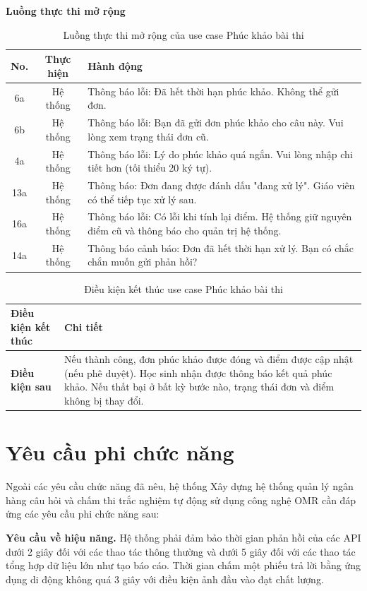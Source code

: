 ﻿\documentclass[../DoAn.tex]{subfiles}
\begin{document}
\noindent\textbf{Luồng thực thi mở rộng}
\begin{table}[H]
\centering
\begin{tabular}{|c|c|p{9cm}|}
\hline
\textbf{No.} & \textbf{Thực hiện} & \textbf{Hành động} \\ \hline
6a & Hệ thống & Thông báo lỗi: Đã hết thời hạn phúc khảo. Không thể gửi đơn. \\ \hline
6b & Hệ thống & Thông báo lỗi: Bạn đã gửi đơn phúc khảo cho câu này. Vui lòng xem trạng thái đơn cũ. \\ \hline
4a & Hệ thống & Thông báo lỗi: Lý do phúc khảo quá ngắn. Vui lòng nhập chi tiết hơn (tối thiểu 20 ký tự). \\ \hline
13a & Hệ thống & Thông báo: Đơn đang được đánh dấu "đang xử lý". Giáo viên có thể tiếp tục xử lý sau. \\ \hline
16a & Hệ thống & Thông báo lỗi: Có lỗi khi tính lại điểm. Hệ thống giữ nguyên điểm cũ và thông báo cho quản trị hệ thống. \\ \hline
14a & Hệ thống & Thông báo cảnh báo: Đơn đã hết thời hạn xử lý. Bạn có chắc chắn muốn gửi phản hồi? \\ \hline
\end{tabular}
\caption{Luồng thực thi mở rộng của use case Phúc khảo bài thi}
\label{table:2.3.5_ext}
\end{table}
\begin{table}[H]
\centering
\begin{tabular}{|p{4cm}|p{10cm}|}
\hline
\textbf{Điều kiện kết thúc} & \textbf{Chi tiết} \\ \hline
\textbf{Điều kiện sau} & Nếu thành công, đơn phúc khảo được đóng và điểm được cập nhật (nếu phê duyệt). Học sinh nhận được thông báo kết quả phúc khảo. Nếu thất bại ở bất kỳ bước nào, trạng thái đơn và điểm không bị thay đổi. \\ \hline
\end{tabular}
\caption{Điều kiện kết thúc use case Phúc khảo bài thi}
\label{table:2.3.5_post}
\end{table}
\section{Yêu cầu phi chức năng}
\label{section:2.4}

Ngoài các yêu cầu chức năng đã nêu, hệ thống Xây dựng hệ thống quản lý ngân hàng câu hỏi và chấm thi trắc nghiệm tự động sử dụng công nghệ OMR cần đáp ứng các yêu cầu phi chức năng sau:

\noindent\textbf{Yêu cầu về hiệu năng.} Hệ thống phải đảm bảo thời gian phản hồi của các API dưới 2 giây đối với các thao tác thông thường và dưới 5 giây đối với các thao tác tổng hợp dữ liệu lớn như tạo báo cáo. Thời gian chấm một phiếu trả lời bằng ứng dụng di động không quá 3 giây với điều kiện ảnh đầu vào đạt chất lượng.
\end{document}

